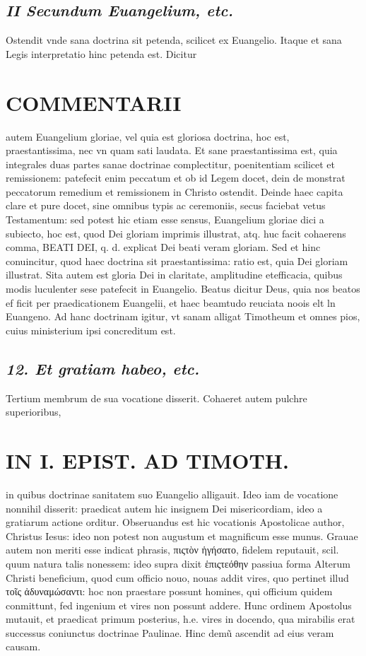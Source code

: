 \documentclass{article}
\begin{document}
\begin{pages}
\subsection*{\textit{II Secundum Euangelium, etc. }}\pstart Ostendit vnde sana doctrina sit petenda, scilicet ex Euangelio. Itaque et sana Legis interpretatio hinc petenda est. Dicitur  \pend
\section*{COMMENTARII }
\marginpar{[ p.30 ]}\pstart autem Euangelium gloriae, vel quia est gloriosa doctrina, hoc est, praestantissima, nec vn quam sati laudata.  \pend\pstart Et sane praestantissima est, quia integrales duas partes sanae doctrinae complectitur, poenitentiam scilicet et remissionem: patefecit enim peccatum et ob id Legem docet, dein de monstrat peccatorum remedium et remissionem in Christo ostendit. Deinde haec capita clare et pure docet, sine omnibus typis ac ceremoniis, secus faciebat vetus Testamentum: sed potest hic etiam esse sensus, Euangelium gloriae dici a subiecto, hoc est, quod Dei gloriam imprimis illustrat, atq. huc facit cohaerens comma, BEATI DEI, q. d. explicat Dei beati veram gloriam. Sed et hinc conuincitur, quod haec doctrina sit praestantissima: ratio est, quia Dei gloriam illustrat. Sita autem est gloria Dei in claritate, amplitudine etefficacia, quibus modis luculenter sese patefecit in Euangelio. Beatus dicitur Deus, quia nos beatos ef ficit per praedicationem Euangelii, et haec beamtudo reuciata noois elt ln Euangeno.  \pend\pstart Ad hanc doctrinam igitur, vt sanam alligat Timotheum et omnes pios, cuius ministerium ipsi concreditum est.  \pend
{}
{}
\subsection*{\textit{12. Et gratiam habeo, etc. }}\pstart Tertium membrum de sua vocatione disserit. Cohaeret autem pulchre superioribus,  \pend
\section*{IN I. EPIST. AD TIMOTH. }
\marginpar{[ p.31 ]}\pstart in quibus doctrinae sanitatem suo Euangelio alligauit. Ideo iam de vocatione nonnihil disserit: praedicat autem hic insignem Dei misericordiam, ideo a gratiarum actione orditur. Obseruandus est hic vocationis Apostolicae author, Christus Iesus: ideo non potest non augustum et magnificum esse munus. Grauae autem non meriti esse indicat phrasis, πιςτὸν ἡγήσατο, fidelem reputauit, scil. quum natura talis nonessem: ideo supra dixit ἑπιςτεόθην passiua forma Alterum Christi beneficium, quod cum officio nouo, nouas addit vires, quo pertinet illud τοῖς ἀδυναμώσαντι: hoc non praestare possunt homines, qui officium quidem conmittunt, fed ingenium et vires non possunt addere. Hunc ordinem Apostolus mutauit, et praedicat primum posterius, h.e. vires in docendo, qua mirabilis erat successus coniunctus doctrinae Paulinae. Hinc demũ ascendit ad eius veram causam.  \pend
{}
{}

\end{pages}
\end{document}
